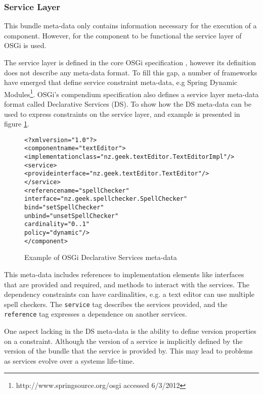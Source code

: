 \subsubsection{Service Layer}
This bundle meta-data only contains information necessary for the execution of a component.
However, for the component to be functional the service layer of OSGi is used.

The service layer is defined in the core OSGi specification \citep{osgicore2007}, however its definition does not describe any meta-data format.
To fill this gap, a number of frameworks have emerged that define service constraint meta-data, e.g
Spring Dynamic Modules\footnote{http://www.springsource.org/osgi accessed 6/3/2012}.
OSGi's compendium specification \citep{osgicompendium2007} also defines a service layer meta-data format called Declarative Services (DS).
To show how the DS meta-data can be used to express constraints on the service layer,
and example is presented in figure \ref{dsmetadata}.

\begin{figure}[htp]
\begin{center}
\begin{alltt}
<?xml version="1.0"?>
<component name="textEditor">
    <implementation class="nz.geek.textEditor.TextEditorImpl"/>
    <service>
        <provide interface="nz.geek.textEditor.TextEditor"/>
    </service>
    <reference name="spellChecker"
        interface="nz.geek.spellchecker.SpellChecker"
        bind="setSpellChecker"
        unbind="unsetSpellChecker"
        cardinality="0..1"
        policy="dynamic"/>
</component>
\end{alltt}
  \caption[OSGi Declarative Services]{Example of OSGi Declarative Services meta-data}
  \label{dsmetadata}
\end{center}
\end{figure}

This meta-data includes references to implementation elements like interfaces that are provided and required, and methods to interact with the services.
The dependency constraints can have cardinalities, e.g. a text editor can use multiple spell checkers.
The \texttt{service} tag describes the services provided, and the \texttt{reference} tag expresses a dependence on another services.

One aspect lacking in the DS meta-data is the ability to define version properties on a constraint.
Although the version of a service is implicitly defined by the version of the bundle that the service is provided by.
This may lead to problems as services evolve over a systems life-time.

